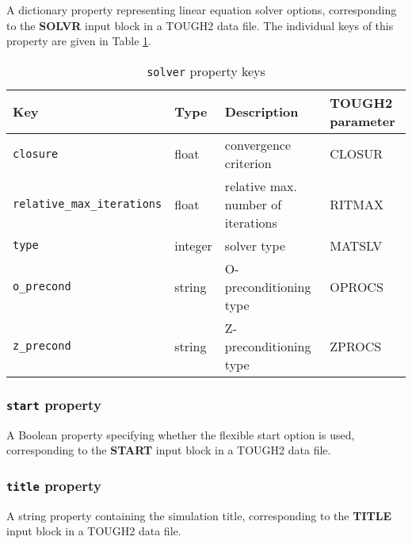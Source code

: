 A dictionary property representing linear equation solver options, corresponding to the \textbf{SOLVR} input block in a TOUGH2 data file.  The individual keys of this property are given in Table \ref{tb:solver}.

\begin{table}
  \begin{center}
    \begin{tabular}{|l|l|l|l|}
      \hline
      \textbf{Key} & \textbf{Type} & \textbf{Description} & \textbf{TOUGH2 parameter}\\
      \hline
      \texttt{closure} & float & convergence criterion & CLOSUR\\
      \texttt{relative\_max\_iterations} & float & relative max. number of iterations & RITMAX\\
      \texttt{type} & integer & solver type & MATSLV\\
      \texttt{o\_precond} & string & O-preconditioning type & OPROCS\\
      \texttt{z\_precond} & string & Z-preconditioning type & ZPROCS\\
      \hline
    \end{tabular}
    \caption{\texttt{solver} property keys}
    \label{tb:solver}
  \end{center}
\end{table}

\begin{snugshade}
\subsubsection{\texttt{start} property}
\end{snugshade}
\label{sec:t2data:start}

A Boolean property specifying whether the flexible start option is used, corresponding to the \textbf{START} input block in a TOUGH2 data file.

\begin{snugshade}
\subsubsection{\texttt{title} property}
\end{snugshade}
\label{sec:t2data:title}

A string property containing the simulation title, corresponding to the \textbf{TITLE} input block in a TOUGH2 data file.

